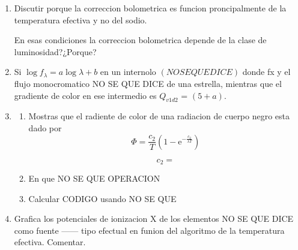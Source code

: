 \documentclass[12pt,spanish,a4paper]{practice}
\begin{document}
\begin{enumerate}[wide, labelwidth=!, labelindent=0pt, label=\textbf{\textrm{\arabic*)}}, ref=\arabic*]
    \item\label{prob:10} Discutir porque la correccion bolometrica es funcion proncipalmente de la temperatura efectiva y no del sodio.

        En esas condiciones la correccion bolometrica depende de la clase de luminosidad?¿Porque?

    \item\label{prob:11} Si $\log f_{\lambda} = a\log\lambda + b$ en un internolo $\left(NO SE QUE DICE\right)$ donde fx y el flujo monocromatico NO SE QUE DICE de una estrella, mientras que el gradiente de color en ese intermedio es $Q_{v1d2}$ = $\left(5+a\right)$.

    \item\label{prob:12}\hfill
        \begin{enumerate}
            \item\label{prob:12:a} Mostras que el radiente de color de una radiacion de cuerpo negro esta dado por
                $$
                    \Phi = \frac{c_2}{T}\left(1 - \mathrm{e}^{-\frac{c_2}{\lambda T}}\right)
                $$

                $$
                    c_2 =
                $$

            \item\label{prob:12:b} En que NO SE QUE OPERACION

            \item\label{prob:12:c} Calcular CODIGO usando NO SE QUE
       \end{enumerate}

    \item\label{prob:13} Grafica los potenciales de ionizacion X de los elementos NO SE QUE DICE como fuente ------ tipo efectual en funion del algoritmo de la temperatura efectiva. Comentar.


\end{enumerate}
\end{document}
